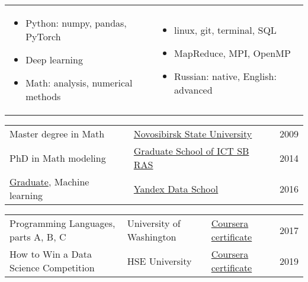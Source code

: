 \documentclass[11pt]{article}
\begin{document}
\begin{longtable} {p{}p{}}
\vspace{-2em}
\begin{itemize}
	\item Python: numpy, pandas, PyTorch
	\item Deep learning
	\item Math: analysis, numerical methods
\end{itemize}
&
\vspace{-2em}
\begin{itemize}
	\item linux, git, terminal, SQL
	\item MapReduce, MPI, OpenMP
	\item Russian: native, English: advanced
\end{itemize}
\\
\end{longtable}

\vspace{-1.5em}
\vspace{-0.5em}
\begin{longtable} {p{}p{}l}
  Master degree in Math & \href{https://english.nsu.ru/}{Novosibirsk State University} &
	 2009	\vspace{0.5em}\\
  PhD in Math modeling & \href{http://www.ict.nsc.ru/ru/education/postgraduate}{Graduate School of ICT SB RAS} & 2014 \vspace{0.5em}\\
	\href{https://academy.yandex.ru/dataschool/graduates}{Graduate}, Machine learning & \href{https://academy.yandex.ru/dataschool/}{Yandex Data School} & 2016 \vspace{0.5em}\\
\end{longtable}
\vspace{-0.5em}
\vspace{-0.5em}
\begin{longtable}{p{}p{}ll}
Programming Languages, parts A, B, C &
University of Washington & \href{https://coursera.org/share/3e187e640ed6df57b0a84ecb8a82ddab}{ Coursera certificate }& 2017 \vspace{0.5em}\\
How to Win a Data Science Competition & HSE University & \href{https://coursera.org/share/0ad3f02a08a405800c29d5909caece90}{ Coursera certificate } & 2019 \vspace{0.5em}\\
\end{longtable}


\end{document}

